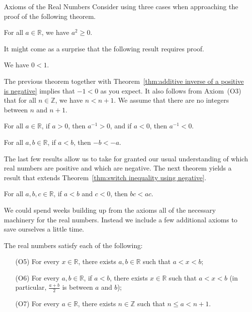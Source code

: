 \begin{section}{Axioms of the Real Numbers}
Consider using three cases when approaching the proof of the following theorem.

\begin{theorem}
For all $a\in\mathbb{R}$, we have $a^2\geq 0$.
\end{theorem}

It might come as a surprise that the following result requires proof.

\begin{theorem}
We have $0<1$.
\end{theorem}

The previous theorem together with Theorem~\ref{thm:additive inverse of a positive is negative} implies that $-1<0$ as you expect. It also follows from Axiom~(O3) that for all $n\in\mathbb{Z}$, we have $n<n+1$. We assume that there are no integers between $n$ and $n+1$.

\begin{theorem}
For all $a\in\mathbb{R}$, if $a>0$, then $a^{-1}>0$, and if $a<0$, then $a^{-1}<0$.
\end{theorem}

\begin{theorem}\label{thm:switch inequality using negative}
For all $a,b\in \mathbb{R}$, if $a<b$, then $-b<-a$. 
\end{theorem}

The last few results allow us to take for granted our usual understanding of which real numbers are positive and which are negative. The next theorem yields a result that extends Theorem~\ref{thm:switch inequality using negative}.

\begin{theorem}
For all $a,b,c\in \mathbb{R}$, if $a<b$ and $c<0$, then $bc<ac$. 
\end{theorem}

We could spend weeks building up from the axioms all of the necessary machinery for the real numbers. Instead we include a few additional axioms to save ourselves a little time.

\begin{additionalaxioms}\label{axiom:additional axioms}
The real numbers satisfy each of the following:
\begin{enumerate}
\item[(O5)] For every $x\in\mathbb{R}$, there exists $a,b\in\mathbb{R}$ such that $a<x<b$;
\item[(O6)] For every $a,b\in\mathbb{R}$, if $a<b$, there exists $x\in\mathbb{R}$ such that $a<x<b$ (in particular, $\frac{a+b}{2}$ is between $a$ and $b$);
\item[(O7)]\label{axiom:archimedean} For every $a\in\mathbb{R}$, there exists $n\in\mathbb{Z}$ such that $n \leq a < n + 1$.
\end{enumerate}	
\end{additionalaxioms}
  

\end{section}
